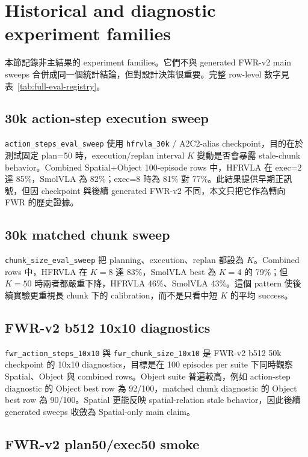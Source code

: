 \documentclass[12pt,a4paper,oneside]{report}
\begin{document}
\section{Historical and diagnostic experiment families}

本節記錄非主結果的 experiment families。它們不與 generated FWR-v2 main sweeps 合併成同一個統計結論，但對設計決策很重要。完整 row-level 數字見表~\ref{tab:full-eval-registry}。

\subsection{30k action-step execution sweep}

\texttt{action\_steps\_eval\_sweep} 使用 \texttt{hfrvla\_30k} / A2C2-alias checkpoint，目的在於測試固定 plan=50 時，execution/replan interval $K$ 變動是否會暴露 stale-chunk behavior。Combined Spatial+Object 100-episode rows 中，HFRVLA 在 exec=2 達 85\%，SmolVLA 為 82\%；exec=8 時為 81\% 對 77\%。此結果提供早期正訊號，但因 checkpoint 與後續 generated FWR-v2 不同，本文只把它作為轉向 FWR 的歷史證據。

\subsection{30k matched chunk sweep}

\texttt{chunk\_size\_eval\_sweep} 把 planning、execution、replan 都設為 $K$。Combined rows 中，HFRVLA 在 $K=8$ 達 83\%，SmolVLA best 為 $K=4$ 的 79\%；但 $K=50$ 時兩者都嚴重下降，HFRVLA 46\%、SmolVLA 43\%。這個 pattern 使後續實驗更重視長 chunk 下的 calibration，而不是只看中短 $K$ 的平均 success。

\subsection{FWR-v2 b512 10x10 diagnostics}

\texttt{fwr\_action\_steps\_10x10} 與 \texttt{fwr\_chunk\_size\_10x10} 是 FWR-v2 b512 50k checkpoint 的 10x10 diagnostics，目標是在 100 episodes per suite 下同時觀察 Spatial、Object 與 combined rows。Object suite 普遍較高，例如 action-step diagnostic 的 Object best row 為 92/100，matched chunk diagnostic 的 Object best row 為 90/100。Spatial 更能反映 spatial-relation stale behavior，因此後續 generated sweeps 收斂為 Spatial-only main claim。

\subsection{FWR-v2 plan50/exec50 smoke}
\end{document}
